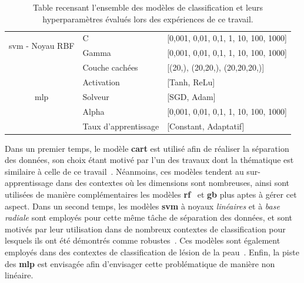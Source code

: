 \begin{table}[H]
\begin{tabular}{cll}
        \multirow{2}{*}{\gls{svm} - Noyau RBF}          & C                         & [0,001, 0,01, 0,1, 1, 10, 100, 1000]      \\ \cmidrule{2-3}   
                                                        & Gamma                     & [0,001, 0,01, 0,1, 1, 10, 100, 1000]      \\ \midrule 
        \multirow{5}{*}{\gls{mlp}}                      & Couche cachées            & [(20,), (20,20,), (20,20,20,)]            \\ \cmidrule{2-3}
                                                        & Activation                & [Tanh, ReLu]                              \\ \cmidrule{2-3}
                                                        & Solveur                   & [SGD, Adam]                               \\ \cmidrule{2-3}
                                                        & Alpha                     & [0,001, 0,01, 0,1, 1, 10, 100, 1000]      \\ \cmidrule{2-3}
                                                        & Taux d'apprentissage      & [Constant, Adaptatif]                     \\ \bottomrule 
    \end{tabular} 
    \caption{Table recensant l'ensemble des modèles de classification et leurs hyperparamètres évalués lors des expériences de ce travail.}
    \label{tab:image_classification_models_hyperparameters}
\end{table}\par

Dans un premier temps, le modèle \textbf{\gls{cart}} est utilisé afin de réaliser la séparation des données, son choix étant motivé par l'un des travaux dont la thématique est similaire à celle de ce travail~\cite{Wiltgen2008}. Néanmoins, ces modèles tendent au sur-apprentissage dans des contextes où les dimensions sont nombreuses, ainsi sont utilisées de manière complémentaires les modèles \textbf{\gls{rf}}~\cite{Breiman2001} et \textbf{\gls{gb}} plus aptes à gérer cet aspect. Dans un second temps, les modèles \textbf{\gls{svm}} à noyaux \textit{linéaires} et à \textit{base radiale} sont employés pour cette même tâche de séparation des données, et sont motivés par leur utilisation dans de nombreux contextes de classification pour lesquels ils ont été démontrés comme robustes~\cite{Smach2008a}. Ces modèles sont également employés dans des contextes de classification de lésion de la peau~\cite{Celebi2007}. Enfin, la piste des \textbf{\gls{mlp}} est envisagée afin d'envisager cette problématique de manière non linéaire.\par

